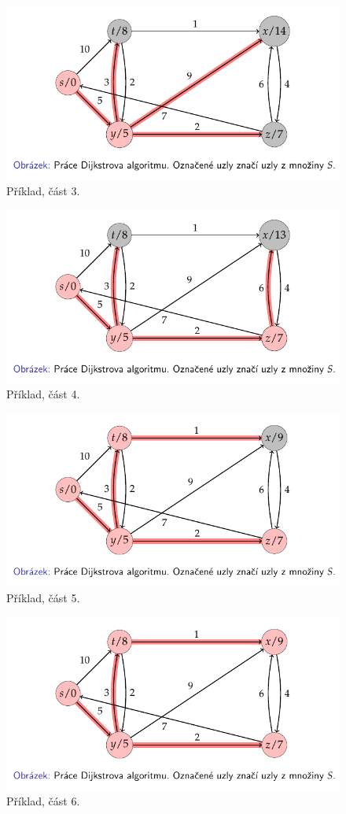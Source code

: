 \begin{figure}[H]
    \centering
    \includegraphics[width=0.80\linewidth]{example_dijkstra_p3.pdf}
    \caption{Příklad, část 3.}
\end{figure}

\begin{figure}[H]
    \centering
    \includegraphics[width=0.80\linewidth]{example_dijkstra_p4.pdf}
    \caption{Příklad, část 4.}
\end{figure}

\begin{figure}[H]
    \centering
    \includegraphics[width=0.80\linewidth]{example_dijkstra_p5.pdf}
    \caption{Příklad, část 5.}
\end{figure}

\begin{figure}[H]
    \centering
    \includegraphics[width=0.80\linewidth]{example_dijkstra_p6.pdf}
    \caption{Příklad, část 6.}
\end{figure}
